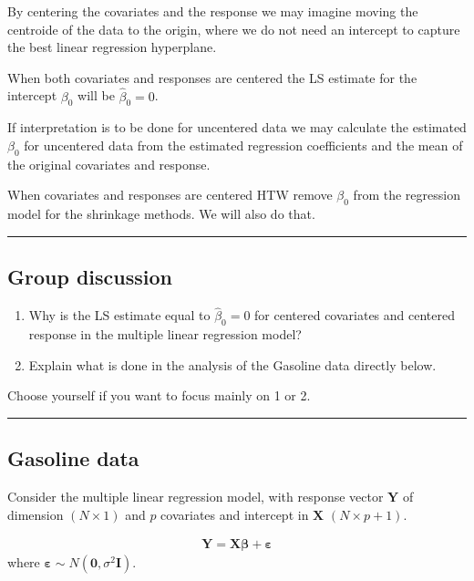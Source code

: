 \documentclass[
  letterpaper,
  DIV=11,
  numbers=noendperiod]{scrartcl}
\begin{document}
By centering the covariates and the response we may imagine moving the
centroide of the data to the origin, where we do not need an intercept
to capture the best linear regression hyperplane.

When both covariates and responses are centered the LS estimate for the
intercept \(\beta_0\) will be \(\hat{\beta}_0=0\).

If interpretation is to be done for uncentered data we may calculate the
estimated \(\beta_0\) for uncentered data from the estimated regression
coefficients and the mean of the original covariates and response.

When covariates and responses are centered HTW remove \(\beta_0\) from
the regression model for the shrinkage methods. We will also do that.

\begin{center}\rule{0.5\linewidth}{0.5pt}\end{center}

\hypertarget{group-discussion}{%
\subsection{Group discussion}\label{group-discussion}}

\begin{enumerate}
\def\labelenumi{\arabic{enumi})}
\item
  Why is the LS estimate equal to \(\hat{\beta}_0=0\) for centered
  covariates and centered response in the multiple linear regression
  model?
\item
  Explain what is done in the analysis of the Gasoline data directly
  below.
\end{enumerate}

Choose yourself if you want to focus mainly on 1 or 2.

\begin{center}\rule{0.5\linewidth}{0.5pt}\end{center}

\hypertarget{gasoline-data}{%
\subsection{Gasoline data}\label{gasoline-data}}

Consider the multiple linear regression model, with response vector
\(\mathbf{Y}\) of dimension \((N \times 1)\) and \(p\) covariates and
intercept in \(\mathbf{X}\) \((N \times p+1)\).

\begin{align}
 \mathbf{Y} = \mathbf{X}\mathbf{\beta} + \mathbf{\varepsilon}
\end{align} where
\(\mathbf{\varepsilon}\sim N(\mathbf{0},\sigma^2\mathbf{I})\).
\end{document}
